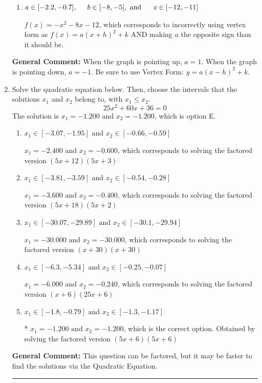 \documentclass{extbook}[14pt]
\newcommand{\litem}[1]{\item #1

\rule{\textwidth}{0.4pt}}
\begin{document}
\begin{enumerate}
{\begin{enumerate}[label=\Alph*.]
$f(x)=x^{2} +8 x + 20$, which corresponds to incorrectly using vertex form as $f(x) = a(x+h)^2+k$.
\item \( a \in [-2.2, -0.7], \hspace*{5mm} b \in [-8, -5], \text{ and } \hspace*{5mm} c \in [-12, -11] \)

$f(x)=-x^{2} -8 x -12$, which corresponds to incorrectly using vertex form as $f(x) = a(x+h)^2+k$ AND making $a$ the opposite sign than it should be.
\end{enumerate}

\textbf{General Comment:} When the graph is pointing up, $a=1$. When the graph is pointing down, $a=-1$. Be sure to use Vertex Form: $y = a(x-h)^2+k$.
}
\litem{
Solve the quadratic equation below. Then, choose the intervals that the solutions $x_1$ and $x_2$ belong to, with $x_1 \leq x_2$.
\[ 25x^{2} +60 x + 36 = 0 \]
The solution is \( x_1 = -1.200 \text{ and } x_2 = -1.200 \), which is option E.\begin{enumerate}[label=\Alph*.]
\item \( x_1 \in [-3.07, -1.95] \text{ and } x_2 \in [-0.66, -0.59] \)

$x_1 = -2.400 \text{ and } x_2 = -0.600$, which corresponds to solving the factored version $(5x + 12)(5x + 3)$
\item \( x_1 \in [-3.81, -3.59] \text{ and } x_2 \in [-0.54, -0.28] \)

$x_1 = -3.600 \text{ and } x_2 = -0.400$, which corresponds to solving the factored version $(5x + 18)(5x + 2)$
\item \( x_1 \in [-30.07, -29.89] \text{ and } x_2 \in [-30.1, -29.94] \)

$x_1 = -30.000 \text{ and } x_2 = -30.000$, which corresponds to solving the factored version $(x + 30)(x + 30)$
\item \( x_1 \in [-6.3, -5.34] \text{ and } x_2 \in [-0.25, -0.07] \)

$x_1 = -6.000 \text{ and } x_2 = -0.240$, which corresponds to solving the factored version $(x + 6)(25x + 6)$
\item \( x_1 \in [-1.8, -0.79] \text{ and } x_2 \in [-1.3, -1.17] \)

* $x_1 = -1.200 \text{ and } x_2 = -1.200$, which is the correct option. Obtained by solving the factored version $(5x + 6)(5x + 6)$
\end{enumerate}

\textbf{General Comment:} This question can be factored, but it may be faster to find the solutions via the Quadratic Equation.
}
\end{enumerate}
\end{document}
